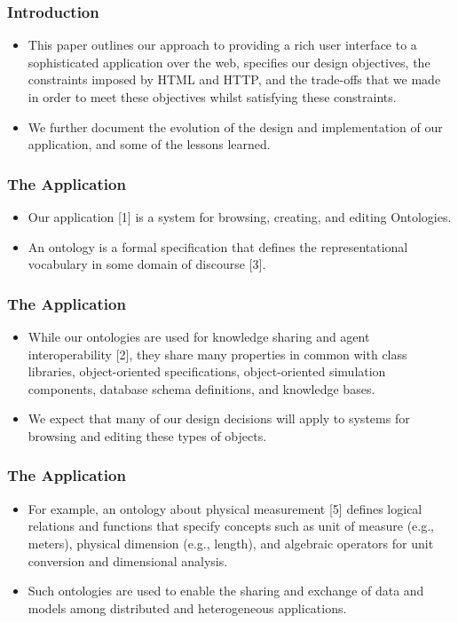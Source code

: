 \documentclass{beamer}
\begin{document}
\begin{frame}
\frametitle{Introduction}

\begin{itemize}
\item This paper outlines our approach to providing a rich user interface to a sophisticated application over the web, specifies our design objectives, the constraints imposed by HTML and HTTP, and the trade-offs that we made in order to meet these objectives whilst satisfying these constraints.
\item We further document the evolution of the design and implementation of our application, and some of the lessons learned.
\end{itemize}

\end{frame}

\begin{frame}
\frametitle{The Application}

\begin{itemize}
\item Our application [1] is a system for browsing, creating, and editing Ontologies.
\item An ontology is a formal specification that defines the representational vocabulary in some domain of discourse [3].
\end{itemize}

\end{frame}

\begin{frame}
\frametitle{The Application}

\begin{itemize}
\item While our ontologies are used for knowledge sharing and agent interoperability [2], they share many properties in common with class libraries, object-oriented specifications, object-oriented simulation components, database schema definitions, and knowledge bases.
\item We expect that many of our design decisions will apply to systems for browsing and editing these types of objects.
\end{itemize}

\end{frame}

\begin{frame}
\frametitle{The Application}

\begin{itemize}
\item For example, an ontology about physical measurement [5] defines logical relations and functions that specify concepts such as unit of measure (e.g., meters), physical dimension (e.g., length), and algebraic operators for unit conversion and dimensional analysis.
\item Such ontologies are used to enable the sharing and exchange of data and models among distributed and heterogeneous applications.
\end{itemize}

\end{frame}
\end{document}
